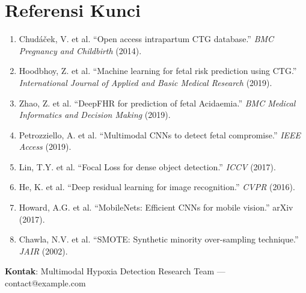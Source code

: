 \documentclass[11pt,a4paper]{article}
\begin{document}
\section*{Referensi Kunci}
\begin{enumerate}[leftmargin=*]
    \item Chudáček, V. et al. ``Open access intrapartum CTG database.'' \textit{BMC Pregnancy and Childbirth} (2014).
    \item Hoodbhoy, Z. et al. ``Machine learning for fetal risk prediction using CTG.'' \textit{International Journal of Applied and Basic Medical Research} (2019).
    \item Zhao, Z. et al. ``DeepFHR for prediction of fetal Acidaemia.'' \textit{BMC Medical Informatics and Decision Making} (2019).
    \item Petrozziello, A. et al. ``Multimodal CNNs to detect fetal compromise.'' \textit{IEEE Access} (2019).
    \item Lin, T.Y. et al. ``Focal Loss for dense object detection.'' \textit{ICCV} (2017).
    \item He, K. et al. ``Deep residual learning for image recognition.'' \textit{CVPR} (2016).
    \item Howard, A.G. et al. ``MobileNets: Efficient CNNs for mobile vision.'' arXiv (2017).
    \item Chawla, N.V. et al. ``SMOTE: Synthetic minority over-sampling technique.'' \textit{JAIR} (2002).
\end{enumerate}

\vfill
\noindent\textbf{Kontak}: Multimodal Hypoxia Detection Research Team --- contact@example.com
\end{document}
